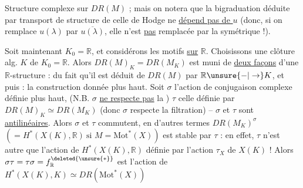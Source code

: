 Structure  complexe sur $DR(M)$ ; mais on notera que
la bigraduation déduite par transport de structure
de celle de Hodge ne \uline{dépend pas de $u$}
(donc, si on remplace $u(\lambda)$ par $\overline{u(\lambda)}$, elle n'est \uline{pas}
remplacée par la symétrique !).


 Soit maintenant $K_0=\mathbb R$, et considérons les
motifs  \uline{sur} $\mathbb R$. Choisissons une clôture alg.
$K$ de $K_0=\mathbb R$. Alors $DR(M)_K=DR(M_K)$
est muni de \uline{deux façons} d'une $\mathbb R$-structure :
du fait qu'il est déduit de $DR(M)$ par $\mathbb R\unsure{-|\to}K$,
et puis : la construction donnée plus haut.
Soit $\sigma$ l'action de conjugaison complexe définie
plus haut, (N.B. $\sigma$ \uline{ne respecte pas} la )
$\tau$ celle définie par $DR(M)_K\simeq DR(M_K)$ (donc
$\sigma$ respecte la filtration) -- $\sigma$ et $\tau$ sont
\uline{antilinéaires}. Alors $\sigma$ et $\tau$ commutent,
en d'autres termes $DR(M_K)^\sigma$ $\left(=H^*(X(K),\mathbb R)\ \text{si }M=\mathrm{Mot}^*(X)\right)$
est stable par $\tau$ : en effet, $\tau$ n'est autre
que l'action de $H^*(X(K),\mathbb R)$ définie par
l'action $\tau_X$ de $X(K)$ ! Alors $\sigma\tau=\tau\sigma=f^{\deleted{\unsure{*}}}_{\mathbb R}$
est l'action de $H^*(X(K),K)\simeq DR(\mathrm{Mot}^*(X))$
